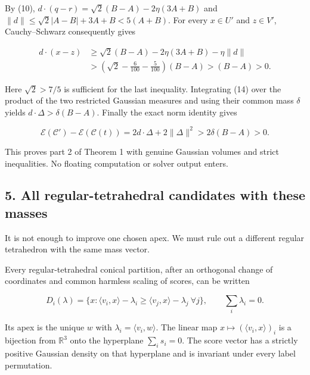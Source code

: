 \documentclass[
  11pt,
]{article}
\begin{document}
By (10), \(d\cdot(q-r)=\sqrt2(B-A)-2\eta(3A+B)\) and
\(\|d\|\le\sqrt2|A-B|+3A+B<5(A+B)\). For every \(x\in U'\) and
\(z\in V'\), Cauchy--Schwarz consequently gives

\begin{equation*}
\begin{aligned}
 d\cdot(x-z)
 &\ge\sqrt2(B-A)-2\eta(3A+B)-\eta\|d\|\\
 &>\left(\sqrt2-\frac6{100}-\frac5{100}\right)(B-A)
   >(B-A)>0.
\end{aligned}                                             \tag{14}
\end{equation*}

Here \(\sqrt2>7/5\) is sufficient for the last inequality. Integrating
(14) over the product of the two restricted Gaussian measures and using
their common mass \(\delta\) yields \(d\cdot\Delta>\delta(B-A)\).
Finally the exact norm identity gives

\[
 \mathcal E(\mathcal C')-\mathcal E(\mathcal C(t))
 =2d\cdot\Delta+2\|\Delta\|^2
 >2\delta(B-A)>0.                                        \tag{15}
\]

This proves part 2 of Theorem 1 with genuine Gaussian volumes and strict
inequalities. No floating computation or solver output enters.

\subsection{5. All regular-tetrahedral candidates with these
masses}\label{all-regular-tetrahedral-candidates-with-these-masses}

It is not enough to improve one chosen apex. We must rule out a
different regular tetrahedron with the same mass vector.

Every regular-tetrahedral conical partition, after an orthogonal change
of coordinates and common harmless scaling of scores, can be written

\[
 D_i(\lambda)=\{x:\langle v_i,x\rangle-\lambda_i
                     \ge\langle v_j,x\rangle-\lambda_j\ \forall j\},
 \qquad\sum_i\lambda_i=0.                               \tag{16}
\]

Its apex is the unique \(w\) with \(\lambda_i=\langle v_i,w\rangle\).
The linear map \(x\mapsto(\langle v_i,x\rangle)_i\) is a bijection from
\(\mathbb R^3\) onto the hyperplane \(\sum_i s_i=0\). The score vector
has a strictly positive Gaussian density on that hyperplane and is
invariant under every label permutation.
\end{document}
